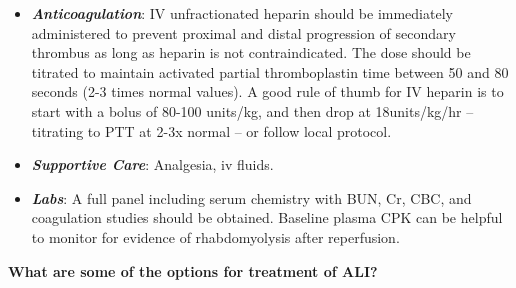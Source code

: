 \documentclass[
]{book}
\begin{document}
\begin{itemize}
\item
  \textbf{\emph{Anticoagulation}}: IV unfractionated heparin should be immediately
  administered to prevent proximal and distal progression of secondary
  thrombus as long as heparin is not contraindicated. The dose should
  be titrated to maintain activated partial thromboplastin time
  between 50 and 80 seconds (2-3 times normal values). A good rule of thumb
  for IV heparin is to start with a bolus of 80-100 units/kg, and then drop
  at 18units/kg/hr -- titrating to PTT at 2-3x normal -- or follow local
  protocol.
\item
  \textbf{\emph{Supportive Care}}: Analgesia, iv fluids.
\item
  \textbf{\emph{Labs}}: A full panel including serum chemistry with BUN, Cr,
  CBC, and coagulation studies should be obtained. Baseline
  plasma CPK can be helpful to monitor for evidence of rhabdomyolysis
  after reperfusion.
\end{itemize}

\textbf{What are some of the options for treatment of ALI?}
\end{document}
